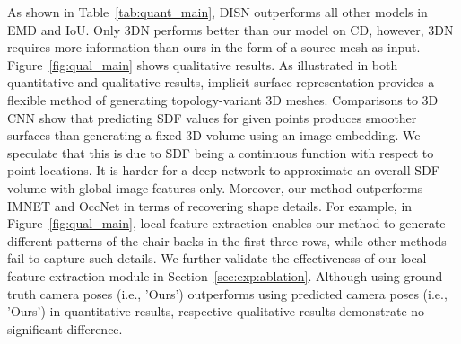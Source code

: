 As shown in Table~\ref{tab:quant_main}, DISN outperforms all other models in EMD and IoU. Only 3DN performs better than our model on CD, however, 3DN requires more information than ours in the form of a source mesh as input. Figure~\ref{fig:qual_main} shows qualitative results. As illustrated in both quantitative and qualitative results, implicit surface representation provides a flexible method of generating topology-variant 3D meshes. Comparisons to 3D CNN show that predicting SDF values for given points produces smoother surfaces than generating a fixed 3D volume using an image embedding. We speculate that this is due to SDF being a continuous function with respect to point locations. It is harder for a deep network to approximate an overall SDF volume with global image features only. Moreover, our method outperforms IMNET and OccNet in terms of recovering shape details. For example, in Figure~\ref{fig:qual_main}, local feature extraction enables our method to generate different patterns of the chair backs in the first three rows, while other methods fail to capture such details. We further validate the effectiveness of our local feature extraction module in Section~\ref{sec:exp:ablation}. Although using ground truth camera poses (i.e., 'Ours') outperforms using predicted camera poses (i.e., 'Ours') in quantitative results, respective qualitative results demonstrate no significant difference. 


